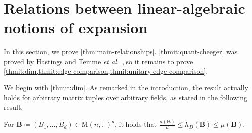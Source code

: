 \documentclass{toc}
\theoremstyle{plain}
\numberwithin{equation}{section}
\theoremstyle{definition}
\newcommand{\F}{\mathbb{F}}
\newcommand{\M}{\mathrm{M}}
\newcommand{\tuple}[1]{\mathbf{#1}}
\newcommand{\vB}{\tuple{B}}
\begin{document}
%

\section{Relations between linear-algebraic notions of expansion}\label{sec:quantum-to-dim}
In this section, we prove \cref{thm:main-relationships}. \cref{thmit:quant-cheeger} was proved by Hastings \cite[Appendix A]{PhysRevA.76.032315} and Temme \emph{et al.}~\cite[Lemma 20]{10.1063/1.3511335}, so it remains to prove \cref{thmit:dim,thmit:edge-comparison,thmit:unitary-edge-comparison}.

We begin with \cref{thmit:dim}. As remarked in the introduction, the result actually holds for arbitrary matrix tuples over arbitrary fields, as stated in the following result.
\begin{proposition}\label{prop:dim_to_rank2}
  For $\vB\coloneqq (B_1, \dots, B_d)\in \M(n, \F)^d$, it holds that $\frac {\mu(\vB)}d\leq h_D(\vB)\leq \mu(\vB)$.
\end{proposition}
\end{document}
